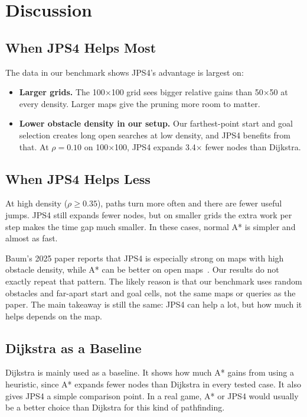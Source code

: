 \documentclass[11pt,a4paper]{article}
\begin{document}
\section{Discussion}

\subsection{When JPS4 Helps Most}

The data in our benchmark shows JPS4's advantage is largest on:
\begin{itemize}[nosep]
  \item \textbf{Larger grids.} The 100$\times$100 grid sees bigger relative gains than 50$\times$50 at every density. Larger maps give the pruning more room to matter.
  \item \textbf{Lower obstacle density in our setup.} Our farthest-point start and goal selection creates long open searches at low density, and JPS4 benefits from that. At $\rho = 0.10$ on 100$\times$100, JPS4 expands 3.4$\times$ fewer nodes than Dijkstra.
\end{itemize}

\subsection{When JPS4 Helps Less}

At high density ($\rho \geq 0.35$), paths turn more often and there are fewer useful jumps. JPS4 still expands fewer nodes, but on smaller grids the extra work per step makes the time gap much smaller. In these cases, normal A* is simpler and almost as fast.

Baum's 2025 paper reports that JPS4 is especially strong on maps with high obstacle density, while A* can be better on open maps~\cite{baum2025}. Our results do not exactly repeat that pattern. The likely reason is that our benchmark uses random obstacles and far-apart start and goal cells, not the same maps or queries as the paper. The main takeaway is still the same: JPS4 can help a lot, but how much it helps depends on the map.

\subsection{Dijkstra as a Baseline}

Dijkstra is mainly used as a baseline. It shows how much A* gains from using a heuristic, since A* expands fewer nodes than Dijkstra in every tested case. It also gives JPS4 a simple comparison point. In a real game, A* or JPS4 would usually be a better choice than Dijkstra for this kind of pathfinding.
\end{document}
